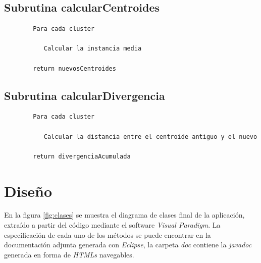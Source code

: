 \documentclass[a4paper]{report}
\begin{document}
	\section{Subrutina calcularCentroides}
	
		\begin{verbatim}
		Para cada cluster
		
		   Calcular la instancia media
		   
		return nuevosCentroides
		\end{verbatim}
	
	\section{Subrutina calcularDivergencia}
	
		\begin{verbatim}
		Para cada cluster 
		   
		   Calcular la distancia entre el centroide antiguo y el nuevo
		   
		return divergenciaAcumulada
		\end{verbatim}

\chapter{Diseño}

En la figura \ref{fig:clases} se muestra el diagrama de clases final de la aplicación, extraído a partir del código mediante el software \textit{Visual Paradigm}. La especificación de cada uno de los métodos se puede encontrar en la documentación adjunta generada con \textit{Eclipse}, la carpeta \textit{doc} contiene la \textit{javadoc} generada en forma de \textit{HTMLs} navegables.
	
\end{document}
